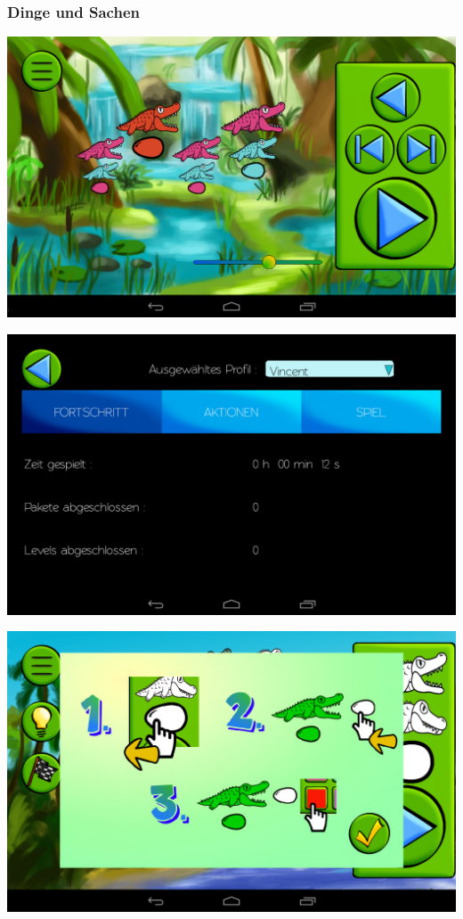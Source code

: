 \documentclass[t]{beamer}
\begin{document}
\begin{frame}
  \frametitle{Dinge und Sachen}
  \includegraphics[width=\textwidth]{images/screenshots/simulation}
\end{frame}

\begin{frame}
	\includegraphics[width=\textwidth]{images/screenshots/progress}
\end{frame}

\begin{frame}
	\includegraphics[width=\textwidth]{images/screenshots/tutorial}
\end{frame}
\end{document}
